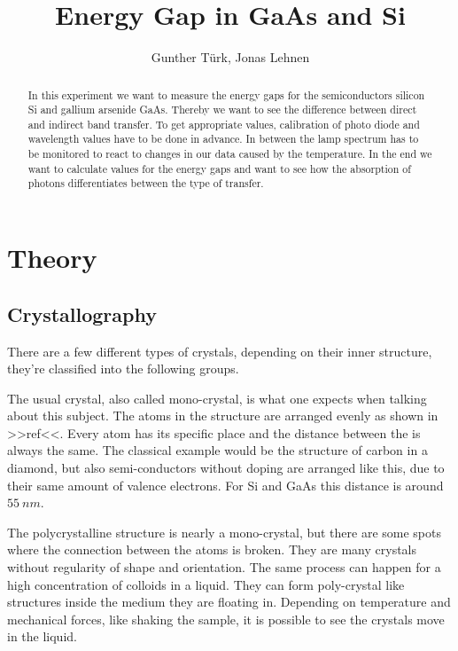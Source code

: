 \documentclass[]{article}
\title{Energy Gap in GaAs and Si}
\author{Gunther T\"urk, Jonas Lehnen}
\begin{document}
\maketitle
\begin{abstract}
In this experiment we want to measure the energy gaps for the semiconductors silicon Si and gallium arsenide GaAs. Thereby we want to see the difference between direct and indirect band transfer. To get appropriate values, calibration of photo diode and wavelength values have to be done in advance. In between the lamp spectrum has to be monitored to react to changes in our data caused by the temperature. In the end we want to calculate values for the energy gaps and want to see how the absorption of photons differentiates between the type of transfer.

\end{abstract}

\tableofcontents

\newpage
\section{Theory}
\subsection{Crystallography}
There are a few different types of crystals, depending on their inner structure, they're classified into the following groups. 

The usual crystal, also called mono-crystal, is what one expects when talking about this subject. The atoms in the structure are arranged evenly as shown in >>ref<<. Every atom has its specific place and the distance between the is always the same. The classical example would be the structure of carbon in a diamond, but also semi-conductors without doping are arranged like this, due to their same amount of valence electrons. For Si and GaAs this distance is around $55\ nm$.

The polycrystalline structure is nearly a mono-crystal, but there are some spots where the connection between the atoms is broken. They are many crystals without regularity of shape and orientation. The same process can happen for a high concentration of colloids in a liquid. They can form poly-crystal like structures inside the medium they are floating in. Depending on temperature and mechanical forces, like shaking the sample, it is possible to see the crystals move in the liquid.
\end{document}
